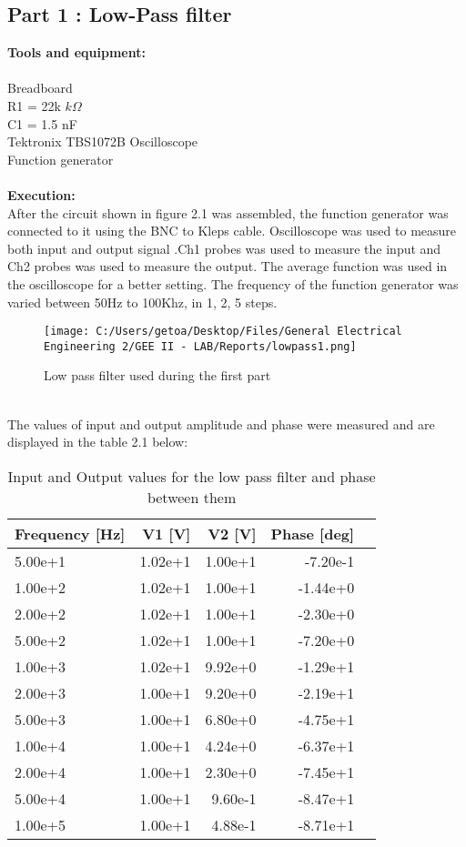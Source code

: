 \documentclass[12pt]{report}
\begin{document}
\subsection {Part 1 : Low-Pass filter } 
\textbf{Tools and equipment:} \\
\\ Breadboard \\
 R1 = 22k $k\Omega $\\
C1 = 1.5 nF \\
Tektronix TBS1072B Oscilloscope
\\  Function generator \\
\\
\textbf{Execution:}\\
After the circuit shown in figure 2.1 was assembled, the function generator was connected to it using the BNC to Kleps cable. Oscilloscope was used to measure both input and output signal .Ch1 probes was used to measure the input and Ch2 probes  was used to measure the output. The average function was used in the oscilloscope for a better setting. The frequency of the function generator was varied between 50Hz to 100Khz, in 1, 2, 5 steps. \\
\begin{figure}[!htp]
  \centering
  \texttt{[image: C:/Users/getoa/Desktop/Files/General Electrical Engineering 2/GEE II - LAB/Reports/lowpass1.png]}
  \caption{Low pass filter used during the first part}
\end{figure}
\\
The values of input and output amplitude and phase were measured and are  displayed in the table 2.1 below:
\begin{table}[!htp]\centering
\begin{tabular}{lrrrr}\toprule
Frequency [Hz] &V1 [V] &V2 [V] &Phase [deg] \\\midrule
5.00e+1 &1.02e+1 &1.00e+1 &-7.20e-1 \\
1.00e+2 &1.02e+1 &1.00e+1 &-1.44e+0 \\
2.00e+2 &1.02e+1 &1.00e+1 &-2.30e+0 \\
5.00e+2 &1.02e+1 &1.00e+1 &-7.20e+0 \\
1.00e+3 &1.02e+1 &9.92e+0 &-1.29e+1 \\
2.00e+3 &1.00e+1 &9.20e+0 &-2.19e+1 \\
5.00e+3 &1.00e+1 &6.80e+0 &-4.75e+1 \\
1.00e+4 &1.00e+1 &4.24e+0 &-6.37e+1 \\
2.00e+4 &1.00e+1 &2.30e+0 &-7.45e+1 \\
5.00e+4 &1.00e+1 &9.60e-1 &-8.47e+1 \\
1.00e+5 &1.00e+1 &4.88e-1 &-8.71e+1 \\
\bottomrule
\end{tabular}
\caption{Input and Output values for the low pass filter and phase between them}\label{tab: }
\end{table}\\
\end{document}
